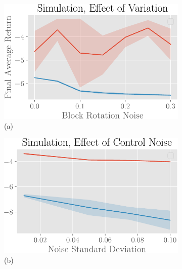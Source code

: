 \begin{figure}[t]
    \vspace{6pt}
    \centering
    \begin{subfigure}[b]{0.32\linewidth}
        \includegraphics[width=0.99\linewidth]{residualrl/figs/env_variance_sim.pdf} \\
        \centering
        (a)
    \end{subfigure}
    \begin{subfigure}[b]{0.32\linewidth}
        \includegraphics[width=0.99\linewidth]{residualrl/figs/control_noise_sim.pdf} \\
        \centering
        (b)
    \end{subfigure}
    \begin{subfigure}[b]{0.32\linewidth}

\end{subfigure}
\end{figure}
